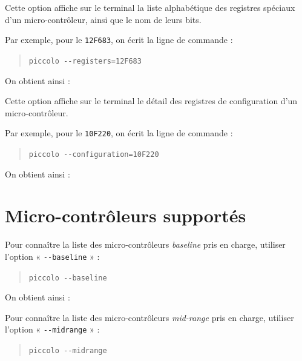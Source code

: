 
Cette option affiche sur le terminal la liste alphabétique des registres spéciaux d'un micro-contrôleur, ainsi que le nom de leurs bits.

Par exemple, pour le \texttt{12F683}, on écrit la ligne de commande :
\begin{quote}
  \texttt{piccolo -{}-registers=12F683}
\end{quote}

On obtient ainsi : 




Cette option affiche sur le terminal le détail des registres de configuration d'un micro-contrôleur.

Par exemple, pour le \texttt{10F220}, on écrit la ligne de commande :
\begin{quote}
  \texttt{piccolo -{}-configuration=10F220}
\end{quote}

On obtient ainsi : 










\section{Micro-contrôleurs supportés}


Pour connaître la liste des micro-contrôleurs \emph{baseline} pris en charge, utiliser l’option « \texttt{-{}-baseline} » :
\begin{quote}
\texttt{piccolo -{}-baseline}
\end{quote}

On obtient ainsi : 








Pour connaître la liste des micro-contrôleurs \emph{mid-range} pris en charge, utiliser l’option « \texttt{-{}-midrange} » :
\begin{quote}
\texttt{piccolo -{}-midrange}
\end{quote}

